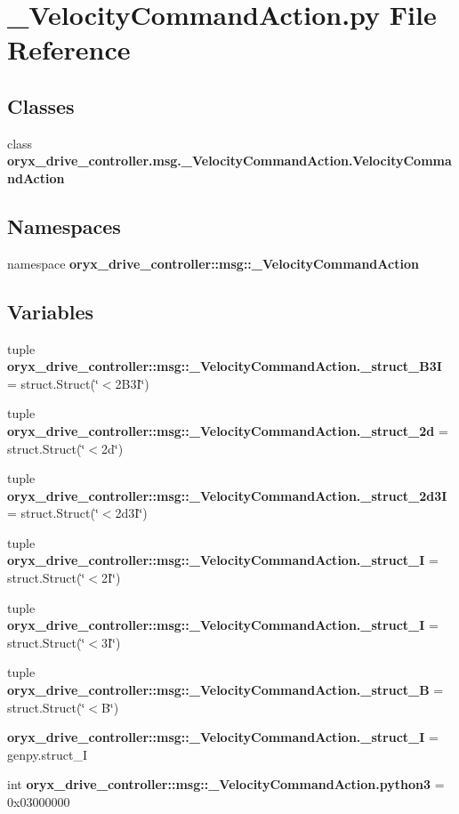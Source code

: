 \section{\-\_\-\-Velocity\-Command\-Action.\-py \-File \-Reference}
\label{__VelocityCommandAction_8py}
\subsection*{\-Classes}
\begin{DoxyCompactItemize}
\item 
class {\bf oryx\-\_\-drive\-\_\-controller.\-msg.\-\_\-\-Velocity\-Command\-Action.\-Velocity\-Command\-Action}
\end{DoxyCompactItemize}
\subsection*{\-Namespaces}
\begin{DoxyCompactItemize}
\item 
namespace {\bf oryx\-\_\-drive\-\_\-controller\-::msg\-::\-\_\-\-Velocity\-Command\-Action}
\end{DoxyCompactItemize}
\subsection*{\-Variables}
\begin{DoxyCompactItemize}
\item 
tuple {\bf oryx\-\_\-drive\-\_\-controller\-::msg\-::\-\_\-\-Velocity\-Command\-Action.\-\_\-struct\-\_\-B3\-I} = struct.\-Struct(\char`\"{}$<$2\-B3\-I\char`\"{})
\item 
tuple {\bf oryx\-\_\-drive\-\_\-controller\-::msg\-::\-\_\-\-Velocity\-Command\-Action.\-\_\-struct\-\_\-2d} = struct.\-Struct(\char`\"{}$<$2d\char`\"{})
\item 
tuple {\bf oryx\-\_\-drive\-\_\-controller\-::msg\-::\-\_\-\-Velocity\-Command\-Action.\-\_\-struct\-\_\-2d3\-I} = struct.\-Struct(\char`\"{}$<$2d3\-I\char`\"{})
\item 
tuple {\bf oryx\-\_\-drive\-\_\-controller\-::msg\-::\-\_\-\-Velocity\-Command\-Action.\-\_\-struct\-\_\-I} = struct.\-Struct(\char`\"{}$<$2\-I\char`\"{})
\item 
tuple {\bf oryx\-\_\-drive\-\_\-controller\-::msg\-::\-\_\-\-Velocity\-Command\-Action.\-\_\-struct\-\_\-I} = struct.\-Struct(\char`\"{}$<$3\-I\char`\"{})
\item 
tuple {\bf oryx\-\_\-drive\-\_\-controller\-::msg\-::\-\_\-\-Velocity\-Command\-Action.\-\_\-struct\-\_\-\-B} = struct.\-Struct(\char`\"{}$<$\-B\char`\"{})
\item 
{\bf oryx\-\_\-drive\-\_\-controller\-::msg\-::\-\_\-\-Velocity\-Command\-Action.\-\_\-struct\-\_\-\-I} = genpy.\-struct\-\_\-\-I
\item 
int {\bf oryx\-\_\-drive\-\_\-controller\-::msg\-::\-\_\-\-Velocity\-Command\-Action.\-python3} = 0x03000000
\end{DoxyCompactItemize}
